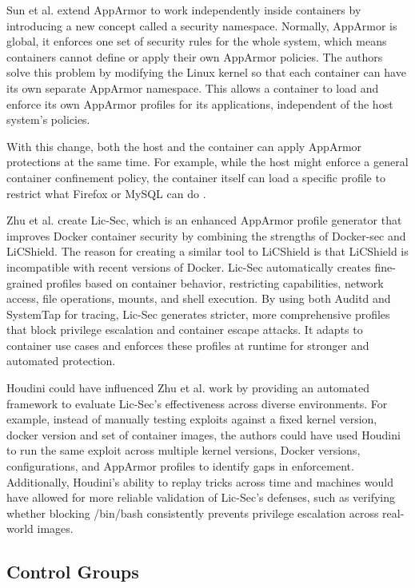 \documentclass[12pt]{report}
\begin{document}
\begin{doublespace}
Sun et al. \cite{sun2018security} extend AppArmor to work independently inside containers by introducing a new concept called a security namespace. Normally, AppArmor is global, it enforces one set of security rules for the whole system, which means containers cannot define or apply their own AppArmor policies. The authors solve this problem by modifying the Linux kernel so that each container can have its own separate AppArmor namespace. This allows a container to load and enforce its own AppArmor profiles for its applications, independent of the host system's policies.

With this change, both the host and the container can apply AppArmor protections at the same time. For example, while the host might enforce a general container confinement policy, the container itself can load a specific profile to restrict what Firefox or MySQL can do \cite{sun2018security}. 

Zhu et al. \cite{zhu2021lic} create Lic-Sec, which is an enhanced AppArmor profile generator that improves Docker container security by combining the strengths of Docker-sec and LiCShield. The reason for creating a similar tool to LiCShield is that LiCShield is incompatible with recent versions of Docker. Lic-Sec automatically creates fine-grained profiles based on container behavior, restricting capabilities, network access, file operations, mounts, and shell execution. By using both Auditd and SystemTap for tracing, Lic-Sec generates stricter, more comprehensive profiles that block privilege escalation and container escape attacks. It adapts to container use cases and enforces these profiles at runtime for stronger and automated protection.

Houdini could have influenced Zhu et al. \cite{zhu2021lic} work by providing an automated framework to evaluate Lic-Sec's effectiveness across diverse environments. For example, instead of manually testing exploits against a fixed kernel version, docker version and set of container images, the authors could have used Houdini to run the same exploit across multiple kernel versions, Docker versions, configurations, and AppArmor profiles to identify gaps in enforcement. Additionally, Houdini’s ability to replay tricks across time and machines would have allowed for more reliable validation of Lic-Sec’s defenses, such as verifying whether blocking /bin/bash consistently prevents privilege escalation across real-world images.



\subsection{Control Groups}


\end{doublespace}
\end{document}
